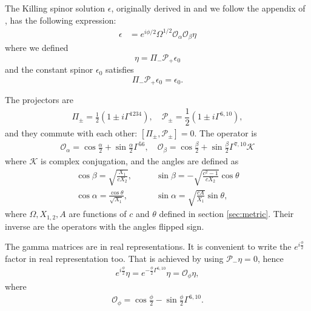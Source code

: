 
The Killing spinor solution $\epsilon$, originally derived in \cite{Pilch:2003jg} and we follow the appendix of \cite{Chen-Lin:2015xlh}, has the following expression:
\begin{align}
\epsilon &= e^{i\phi/2}\Omega^{1/2} \mathcal{O}_\alpha \mathcal{O}_\beta \eta
\end{align}
where we defined
\begin{equation}
\eta = \Pi_{-} \mathcal{P}_+ \epsilon_0
\end{equation}
and the constant spinor $\epsilon_0$ satisfies
\begin{equation}
 \Pi_- \mathcal{P}_+ \epsilon_0 = \epsilon_0.
\end{equation}

The projectors are
\begin{align}
\Pi_\pm = 
\frac{1}{2}\left(1 \pm i\Gamma^{1234}\right), 
\quad
\mathcal{P}_{\pm} =
\dfrac{1}{2} \left(1\pm i\Gamma^{6,10}\right),
\end{align}
and they commute with each other: $[\Pi_\pm, \mathcal{P}_{\pm}]=0$.
The operator is
\begin{align}
\mathcal{O}_\alpha = \cos\frac{\alpha}{2} + \sin\frac{\alpha}{2}\Gamma^{5 6},
\quad
\mathcal{O}_\beta = \cos\frac{\beta}{2} + \sin\frac{\beta}{2}\Gamma^{7, 10}\mathcal{K}
\end{align}
where $\mathcal{K}$ is complex conjugation, and the angles are defined as
\begin{align}
\cos\beta = \sqrt{\frac{X_1}{c X_2}}, \quad 
&\quad
\sin\beta = -\sqrt{\frac{c^2 - 1}{c X_2}}\cos\theta\\
%
\cos\alpha = \frac{\cos\theta}{\sqrt{X_1}}, 
&\quad
\sin\alpha = \sqrt{\frac{c A}{X_1}}\sin\theta,
\end{align}
where $\Omega, X_{1,2}, A$ are functions of $c$ and $\theta$ defined in section \ref{sec:metric}. Their inverse are the operators with the angles flipped sign.


The gamma matrices are in real representations. It is convenient to write the $e^{i \frac{\phi}{2}}$ factor in real representation too. 
That is achieved by using $\mathcal{P}_- \eta = 0 $, hence
\begin{align}
 e^{i \frac{\phi}{2}} \eta 
    = e^{-\frac{\phi}{2}\Gamma^{6,10}} \eta
    = \mathcal{O}_\phi \eta,
\end{align}
where 
\begin{align}
 \mathcal{O}_\phi = \cos\frac{\phi}{2} - \sin\frac{\phi}{2}\Gamma^{6, 10}.
\end{align}

